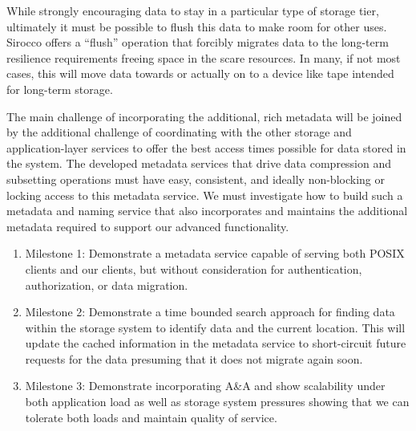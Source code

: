While strongly encouraging data to stay in a particular type of storage tier,
ultimately it must be possible to flush this data to make room for other uses.
Sirocco offers a ``flush'' operation that forcibly migrates data to the
long-term resilience requirements freeing space in the scare resources. In
many, if not most cases, this will move data towards or actually on to a device
like tape intended for long-term storage.

The main challenge of incorporating the additional, rich metadata will be
joined by the additional challenge of coordinating with the other storage and
application-layer services to offer the best access times possible for data
stored in the system. The developed metadata services that drive data
compression and subsetting operations must have easy, consistent, and ideally
non-blocking or locking access to this metadata service. We must investigate
how to build such a metadata and naming service that also incorporates and
maintains the additional metadata required to support our advanced
functionality.

\begin{enumerate}

\item Milestone 1: Demonstrate a metadata service capable of serving both POSIX
clients and our clients, but without consideration for authentication,
authorization, or data migration.

\item Milestone 2: Demonstrate a time bounded search approach for finding data
within the storage system to identify data and the current location.  This will
update the cached information in the metadata service to short-circuit future
requests for the data presuming that it does not migrate again soon.

\item Milestone 3: Demonstrate incorporating A\&A and show scalability under
both application load as well as storage system pressures showing that we can
tolerate both loads and maintain quality of service.

\end{enumerate}

